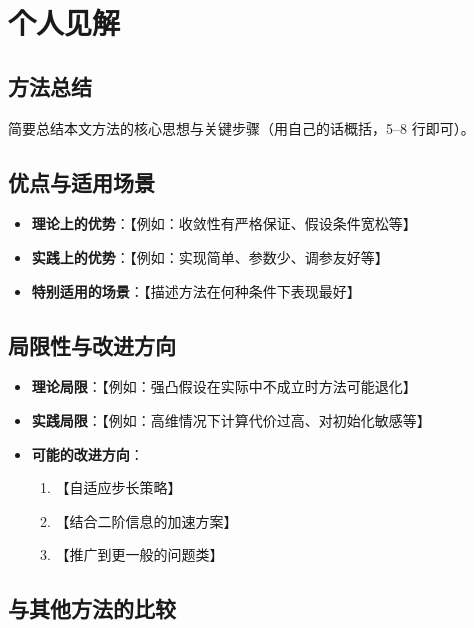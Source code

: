 \section{个人见解}

\subsection{方法总结}

简要总结本文方法的核心思想与关键步骤（用自己的话概括，5--8 行即可）。

\subsection{优点与适用场景}

\begin{itemize}
    \item \textbf{理论上的优势}：【例如：收敛性有严格保证、假设条件宽松等】
    \item \textbf{实践上的优势}：【例如：实现简单、参数少、调参友好等】
    \item \textbf{特别适用的场景}：【描述方法在何种条件下表现最好】
\end{itemize}

\subsection{局限性与改进方向}

\begin{itemize}
    \item \textbf{理论局限}：【例如：强凸假设在实际中不成立时方法可能退化】
    \item \textbf{实践局限}：【例如：高维情况下计算代价过高、对初始化敏感等】
    \item \textbf{可能的改进方向}：
    \begin{enumerate}
        \item 【自适应步长策略】
        \item 【结合二阶信息的加速方案】
        \item 【推广到更一般的问题类】
    \end{enumerate}
\end{itemize}

\subsection{与其他方法的比较}

